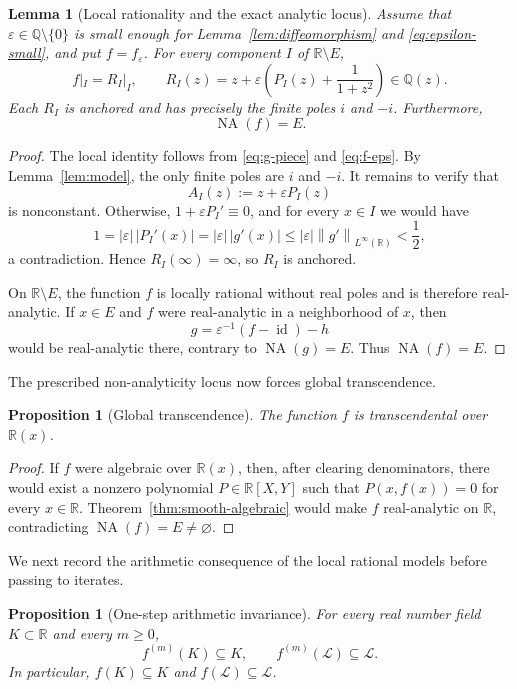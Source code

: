 \documentclass[11pt,reqno]{amsart}
\numberwithin{equation}{section}
\newtheorem{proposition}[theorem]{Proposition}
\newtheorem{lemma}[theorem]{Lemma}
\theoremstyle{definition}
\theoremstyle{remark}
\newcommand{\R}{\mathbb R}
\newcommand{\Q}{\mathbb Q}
\newcommand{\Lio}{\mathscr L}
\newcommand{\id}{\operatorname{id}}
\newcommand{\NA}{\operatorname{NA}}
\newcommand{\norm}[1]{\left\lVert #1\right\rVert}
\begin{document}
\begin{lemma}[Local rationality and the exact analytic locus]\label{lem:local-rationality}
Assume that $\varepsilon\in\Q\setminus\{0\}$ is small enough for Lemma~\ref{lem:diffeomorphism} and \eqref{eq:epsilon-small}, and put $f=f_\varepsilon$. For every component $I$ of $\R\setminus E$,
\[
f|_I=R_I|_I,
\qquad
R_I(z)=z+\varepsilon\left(P_I(z)+\frac1{1+z^2}\right)\in\Q(z).
\]
Each $R_I$ is anchored and has precisely the finite poles $i$ and $-i$. Furthermore,
\[
\NA(f)=E.
\]
\end{lemma}

\begin{proof}
The local identity follows from \eqref{eq:g-piece} and \eqref{eq:f-eps}. By Lemma~\ref{lem:model}, the only finite poles are $i$ and $-i$. It remains to verify that
\[
A_I(z):=z+\varepsilon P_I(z)
\]
is nonconstant. Otherwise, $1+\varepsilon P_I'\equiv0$, and for every $x\in I$ we would have
\[
1=|\varepsilon|\,|P_I'(x)|
=|\varepsilon|\,|g'(x)|
\leq |\varepsilon|\norm{g'}_{L^\infty(\R)}<\frac12,
\]
a contradiction. Hence $R_I(\infty)=\infty$, so $R_I$ is anchored.

On $\R\setminus E$, the function $f$ is locally rational without real poles and is therefore real-analytic. If $x\in E$ and $f$ were real-analytic in a neighborhood of $x$, then
\[
g=\varepsilon^{-1}(f-\id)-h
\]
would be real-analytic there, contrary to $\NA(g)=E$. Thus $\NA(f)=E$.
\end{proof}

The prescribed non-analyticity locus now forces global transcendence.

\begin{proposition}[Global transcendence]\label{prop:transcendence}
The function $f$ is transcendental over $\R(x)$.
\end{proposition}

\begin{proof}
If $f$ were algebraic over $\R(x)$, then, after clearing denominators, there would exist a nonzero polynomial $P\in\R[X,Y]$ such that $P(x,f(x))=0$ for every $x\in\R$. Theorem~\ref{thm:smooth-algebraic} would make $f$ real-analytic on $\R$, contradicting $\NA(f)=E\neq\varnothing$.
\end{proof}

We next record the arithmetic consequence of the local rational models before passing to iterates.

\begin{proposition}[One-step arithmetic invariance]\label{prop:one-step}
For every real number field $K\subset\R$ and every $m\geq0$,
\[
f^{(m)}(K)\subseteq K,
\qquad
f^{(m)}(\Lio)\subseteq\Lio.
\]
In particular, $f(K)\subseteq K$ and $f(\Lio)\subseteq\Lio$.
\end{proposition}
\end{document}

